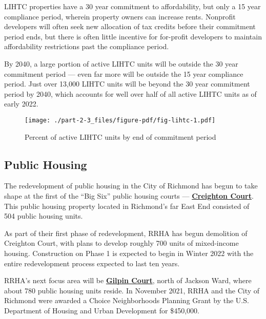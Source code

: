 \documentclass[
  letterpaper,
  DIV=11,
  numbers=noendperiod]{scrreprt}
\begin{document}
LIHTC properties have a 30 year commitment to affordability, but only a
15 year compliance period, wherein property owners can increase rents.
Nonprofit developers will often seek new allocation of tax credits
before their commitment period ends, but there is often little incentive
for for-profit developers to maintain affordability restrictions past
the compliance period.

By 2040, a large portion of active LIHTC units will be outside the 30
year commitment period --- even far more will be outside the 15 year
compliance period. Just over 13,000 LIHTC units will be beyond the 30
year commitment period by 2040, which accounts for well over half of all
active LIHTC units as of early 2022.

\begin{figure}

{\centering \texttt{[image: ./part-2-3\_files/figure-pdf/fig-lihtc-1.pdf]}

}

\caption{\label{fig-lihtc}Percent of active LIHTC units by end of
commitment period}

\end{figure}

\hypertarget{public-housing}{%
\subsection{Public Housing}\label{public-housing}}

The redevelopment of public housing in the City of Richmond has begun to
take shape at the first of the ``Big Six'' public housing courts ---
\href{https://www.rrha.com/redevelopment/creighton/}{\textbf{Creighton
Court}}. This public housing property located in Richmond's far East End
consisted of 504 public housing units.

As part of their first phase of redevelopment, RRHA has begun demolition
of Creighton Court, with plans to develop roughly 700 units of
mixed-income housing. Construction on Phase 1 is expected to begin in
Winter 2022 with the entire redevelopment process expected to last ten
years.

RRHA's next focus area will be
\href{https://www.rrha.com/redevelopment/jackson-ward/}{\textbf{Gilpin
Court}}, north of Jackson Ward, where about 780 public housing units
reside. In November 2021, RRHA and the City of Richmond were awarded a
Choice Neighborhoods Planning Grant by the U.S. Department of Housing
and Urban Development for \$450,000.
\end{document}
